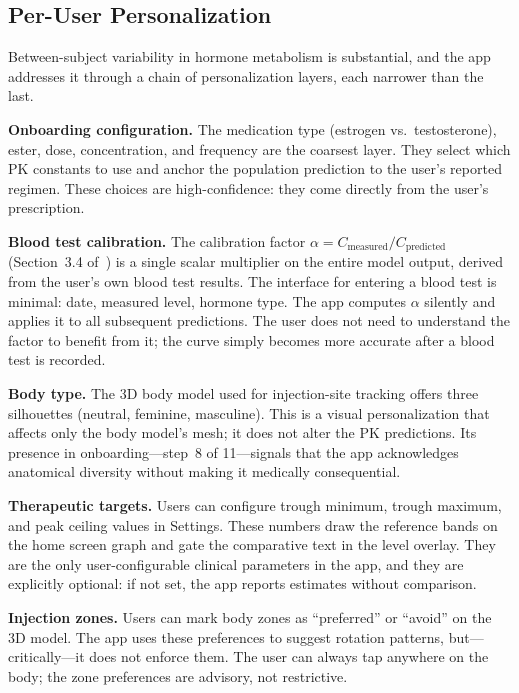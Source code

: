 \documentclass[11pt,a4paper]{article}
\begin{document}
\subsection{Per-User Personalization}
\label{sec:personalization}

Between-subject variability in hormone metabolism is substantial, and the
app addresses it through a chain of personalization layers, each narrower
than the last.

\textbf{Onboarding configuration.} The medication type (estrogen vs.\
testosterone), ester, dose, concentration, and frequency are the coarsest
layer. They select which PK constants to use and anchor the population
prediction to the user's reported regimen. These choices are
high-confidence: they come directly from the user's prescription.

\textbf{Blood test calibration.} The calibration factor
$\alpha = C_{\text{measured}} / C_{\text{predicted}}$
(Section~3.4 of~\cite{xtpk}) is a single scalar multiplier on the entire
model output, derived from the user's own blood test results. The
interface for entering a blood test is minimal: date, measured level,
hormone type. The app computes $\alpha$ silently and applies it to all
subsequent predictions. The user does not need to understand the factor
to benefit from it; the curve simply becomes more accurate after a blood
test is recorded.

\textbf{Body type.} The 3D body model used for injection-site tracking
offers three silhouettes (neutral, feminine, masculine). This is a visual
personalization that affects only the body model's mesh; it does not
alter the PK predictions. Its presence in onboarding---step~8 of
11---signals that the app acknowledges anatomical diversity without
making it medically consequential.

\textbf{Therapeutic targets.} Users can configure trough minimum, trough
maximum, and peak ceiling values in Settings. These numbers draw the
reference bands on the home screen graph and gate the comparative text in
the level overlay. They are the only user-configurable clinical
parameters in the app, and they are explicitly optional: if not set, the
app reports estimates without comparison.

\textbf{Injection zones.} Users can mark body zones as ``preferred'' or
``avoid'' on the 3D model. The app uses these preferences to suggest
rotation patterns, but---critically---it does not enforce them. The user
can always tap anywhere on the body; the zone preferences are advisory,
not restrictive.
\end{document}
